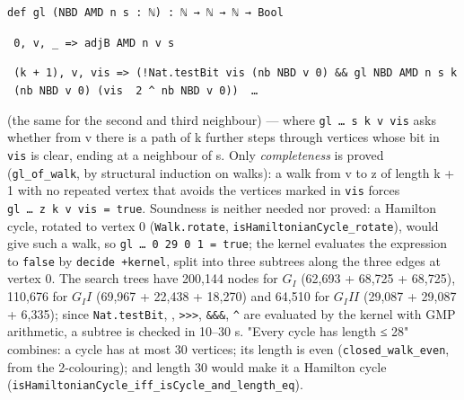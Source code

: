 \documentclass[11pt,a4paper]{article}
\theoremstyle{named}
\begin{document}
\begin{leancode}
\item \texttt{def\ \allowbreak{}gl\ \allowbreak{}(NBD\ \allowbreak{}AMD\ \allowbreak{}n\ \allowbreak{}s\ \allowbreak{}:\ \allowbreak{}ℕ)\ \allowbreak{}:\ \allowbreak{}ℕ\ \allowbreak{}→\ \allowbreak{}ℕ\ \allowbreak{}→\ \allowbreak{}ℕ\ \allowbreak{}→\ \allowbreak{}Bool}
\item \texttt{\textbar{}\ \allowbreak{}0,\ \allowbreak{}v,\ \allowbreak{}\_\allowbreak{}\ \allowbreak{}=\textgreater{}\ \allowbreak{}adjB\ \allowbreak{}AMD\ \allowbreak{}n\ \allowbreak{}v\ \allowbreak{}s}
\item \texttt{\textbar{}\ \allowbreak{}(k\ \allowbreak{}+\ \allowbreak{}1),\ \allowbreak{}v,\ \allowbreak{}vis\ \allowbreak{}=\textgreater{}\ \allowbreak{}(!Nat.\allowbreak{}testBit\ \allowbreak{}vis\ \allowbreak{}(nb\ \allowbreak{}NBD\ \allowbreak{}v\ \allowbreak{}0)\ \allowbreak{}\&\&\ \allowbreak{}gl\ \allowbreak{}NBD\ \allowbreak{}AMD\ \allowbreak{}n\ \allowbreak{}s\ \allowbreak{}k\ \allowbreak{}(nb\ \allowbreak{}NBD\ \allowbreak{}v\ \allowbreak{}0)\ \allowbreak{}(vis\ \allowbreak{}\textbar{}\textbar{}\textbar{}\ \allowbreak{}2\ \allowbreak{}\textasciicircum{}\ \allowbreak{}nb\ \allowbreak{}NBD\ \allowbreak{}v\ \allowbreak{}0))\ \allowbreak{}\textbar{}\textbar{}\ \allowbreak{}…}
\end{leancode}
(the same for the second and third neighbour) — where \texttt{gl\ \allowbreak{}…\ \allowbreak{}s\ \allowbreak{}k\ \allowbreak{}v\ \allowbreak{}vis} asks whether from v there is a path of k further steps through vertices whose bit in \texttt{vis} is clear, ending at a neighbour of s. Only \textit{completeness} is proved (\texttt{gl\_\allowbreak{}of\_\allowbreak{}walk}, by structural induction on walks): a walk from v to z of length k + 1 with no repeated vertex that avoids the vertices marked in \texttt{vis} forces \texttt{gl\ \allowbreak{}…\ \allowbreak{}z\ \allowbreak{}k\ \allowbreak{}v\ \allowbreak{}vis\ \allowbreak{}=\ \allowbreak{}true}. Soundness is neither needed nor proved: a Hamilton cycle, rotated to vertex 0 (\texttt{Walk.\allowbreak{}rotate}, \texttt{isHamiltonianCycle\_\allowbreak{}rotate}), would give such a walk, so \texttt{gl\ \allowbreak{}…\ \allowbreak{}0\ \allowbreak{}29\ \allowbreak{}0\ \allowbreak{}1\ \allowbreak{}=\ \allowbreak{}true}; the kernel evaluates the expression to \texttt{false} by \texttt{decide\ \allowbreak{}+kernel}, split into three subtrees along the three edges at vertex 0. The search trees have 200,144 nodes for $G_I$ (62,693 + 68,725 + 68,725), 110,676 for $G_II$ (69,967 + 22,438 + 18,270) and 64,510 for $G_III$ (29,087 + 29,087 + 6,335); since \texttt{Nat.\allowbreak{}testBit}, \texttt{\textbar{}\textbar{}\textbar{}}, \texttt{\textgreater{}\textgreater{}\textgreater{}}, \texttt{\&\&\&}, \texttt{\textasciicircum{}} are evaluated by the kernel with GMP arithmetic, a subtree is checked in 10–30 s. "Every cycle has length ≤ 28" combines: a cycle has at most 30 vertices; its length is even (\texttt{closed\_\allowbreak{}walk\_\allowbreak{}even}, from the 2-colouring); and length 30 would make it a Hamilton cycle (\texttt{isHamiltonianCycle\_\allowbreak{}iff\_\allowbreak{}isCycle\_\allowbreak{}and\_\allowbreak{}length\_\allowbreak{}eq}).
\end{document}
